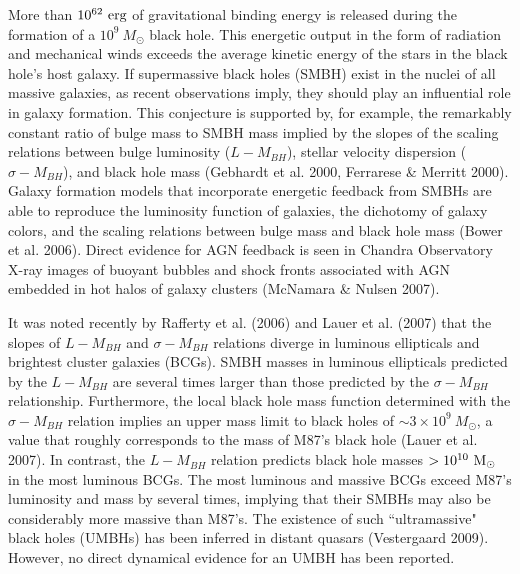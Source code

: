 \documentclass[12pt]{article}
\begin{document}
%
%
\def\gae{\mathrel{\hbox{\rlap{\hbox{\lower2pt\hbox{$\sim$}}}\hbox{\raise2pt\hbox
{$>$}}}}}

\justification          %

More than $10^{62}~\rm erg$ of gravitational binding energy is released during the formation of a $10^9~M_\odot$ black hole.  This energetic output in the form of radiation and mechanical winds exceeds the average kinetic energy of the stars in
the black hole's  host galaxy.  If supermassive black holes (SMBH) exist in the nuclei of all massive galaxies, as recent observations imply, they should play an influential role in galaxy formation.  This conjecture is supported by, for example,  the remarkably constant ratio of bulge mass to SMBH mass implied by the slopes of the  scaling relations between bulge luminosity ($L-M_{BH}$), stellar velocity dispersion ($\sigma - M_{BH}$), and black hole mass (Gebhardt et al. 2000, Ferrarese \& Merritt 2000).   Galaxy formation models that incorporate energetic feedback  from SMBHs 
are able to reproduce the luminosity function of galaxies,  the dichotomy of galaxy colors,  and
the scaling relations between bulge mass and black hole mass (Bower et al. 2006).  Direct evidence for AGN feedback is seen in Chandra Observatory X-ray images of buoyant bubbles and shock fronts associated with AGN embedded in hot halos of galaxy clusters (McNamara \& Nulsen 2007). 


It was noted recently by Rafferty et al. (2006) and Lauer et al. (2007) that the slopes of  $L-M_{BH}$ and  $\sigma - M_{BH}$ relations diverge in luminous ellipticals and brightest cluster galaxies (BCGs).  SMBH masses in luminous ellipticals predicted by the $L- M_{BH}$  are several times larger than those predicted by the $\sigma-M_{BH}$ relationship. Furthermore, the local black hole mass function determined with the $\sigma - M_{BH}$ relation implies an upper mass limit to black holes of $\sim 3\times 10^9~ M_\odot$, a value that roughly corresponds to the mass of M87's black hole (Lauer et al. 2007).
In contrast, the $L-M_{BH}$ relation predicts black hole masses  $> 10^{10}~\rm M_\odot$ in the most luminous BCGs.
The most luminous and massive BCGs exceed M87's luminosity and mass by several 
times, implying that their SMBHs may also be considerably more massive than M87's.    The existence of such ``ultramassive" black holes (UMBHs) has been inferred in distant quasars (Vestergaard 2009).   However,  no direct dynamical evidence for an UMBH has been reported.  
\end{document}

